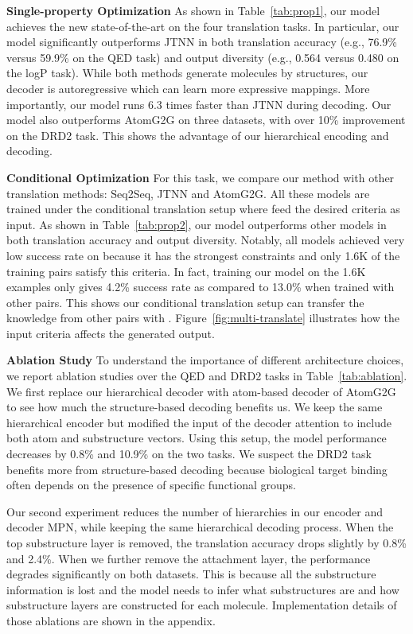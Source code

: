 \documentclass{article} \usepackage{iclr2020_conference,times}
\begin{document}
\textbf{Single-property Optimization } As shown in Table~\ref{tab:prop1}, our model achieves the new state-of-the-art on the four translation tasks. In particular, our model significantly outperforms JTNN in both translation accuracy (e.g., 76.9\% versus 59.9\% on the QED task) and output diversity (e.g., 0.564 versus 0.480 on the logP task). While both methods generate molecules by structures, our decoder is autoregressive which can learn more expressive mappings. 
More importantly, our model runs 6.3 times faster than JTNN during decoding. 
Our model also outperforms AtomG2G on three datasets, with over 10\% improvement on the DRD2 task. This shows the advantage of our hierarchical encoding and decoding.

\textbf{Conditional Optimization } For this task, we compare our method with other translation methods: Seq2Seq, JTNN and AtomG2G. All these models are trained under the conditional translation setup where feed the desired criteria  as input.
As shown in Table~\ref{tab:prop2}, our model outperforms other models in both translation accuracy and output diversity. Notably, all models achieved very low success rate on  because it has the strongest constraints and only 1.6K of the training pairs satisfy this criteria. In fact, training our model on the 1.6K examples only gives 4.2\% success rate as compared to 13.0\% when trained with other pairs. This shows our conditional translation setup can transfer the knowledge from other pairs with .
Figure~\ref{fig:multi-translate} illustrates how the input criteria  affects the generated output.

\textbf{Ablation Study } To understand the importance of different architecture choices, we report ablation studies over the QED and DRD2 tasks in Table~\ref{tab:ablation}. We first replace our hierarchical decoder with atom-based decoder of AtomG2G to see how much the structure-based decoding benefits us. We keep the same hierarchical encoder but modified the input of the decoder attention to include both atom and substructure vectors. Using this setup, the model performance decreases by 0.8\% and 10.9\% on the two tasks. We suspect the DRD2 task benefits more from structure-based decoding because biological target binding often depends on the presence of specific functional groups.

Our second experiment reduces the number of hierarchies in our encoder and decoder MPN, while keeping the same hierarchical decoding process. When the top substructure layer is removed, the translation accuracy drops slightly by 0.8\% and 2.4\%. When we further remove the attachment layer, the performance degrades significantly on both datasets. This is because all the substructure information is lost and the model needs to infer what substructures are and how substructure layers are constructed for each molecule.
Implementation details of those ablations are shown in the appendix.
\end{document}
